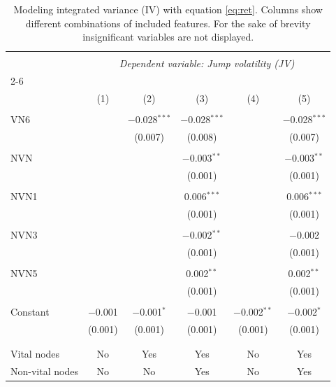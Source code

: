 
\begin{table}[!htbp] \centering 
  \caption{Modeling integrated variance (IV) with equation \eqref{eq:ret}. Columns show different combinations of included features. For the sake of brevity insignificant variables are not displayed. } 
  \label{Jmodels1_t} 
\tiny 
\begin{tabular}{@{\extracolsep{5pt}}lccccc} 
\\[-1.8ex]\hline 
\hline \\[-1.8ex] 
 & \multicolumn{5}{c}{\textit{Dependent variable: Jump volatility (JV)}} \\ 
\cline{2-6} 
\\[-1.8ex] & (1) & (2) & (3) & (4) & (5)\\ 
\hline \\[-1.8ex] 
 VN6 &  & $-$0.028$^{***}$ & $-$0.028$^{***}$ &  & $-$0.028$^{***}$ \\ 
 &  & (0.007) & (0.008) &  & (0.007) \\ 
 & & & & & \\ 
 NVN &  &  & $-$0.003$^{**}$ &  & $-$0.003$^{**}$ \\ 
 &  &  & (0.001) &  & (0.001) \\ 
 & & & & & \\ 
 NVN1 &  &  & 0.006$^{***}$ &  & 0.006$^{***}$ \\ 
 &  &  & (0.001) &  & (0.001) \\ 
 & & & & & \\ 
 NVN3 &  &  & $-$0.002$^{**}$ &  & $-$0.002 \\ 
 &  &  & (0.001) &  & (0.001) \\ 
 & & & & & \\ 
 NVN5 &  &  & 0.002$^{**}$ &  & 0.002$^{**}$ \\ 
 &  &  & (0.001) &  & (0.001) \\ 
 & & & & & \\ 
 Constant & $-$0.001 & $-$0.001$^{*}$ & $-$0.001 & $-$0.002$^{**}$ & $-$0.002$^{*}$ \\ 
 & (0.001) & (0.001) & (0.001) & (0.001) & (0.001) \\ 
 & & & & & \\ 
 \hline \\[-1.8ex] 
 Vital nodes & No & Yes & Yes & No & Yes \\ 
 Non-vital nodes & No & No & Yes & No & Yes \\ 

\end{tabular}
\end{table}
